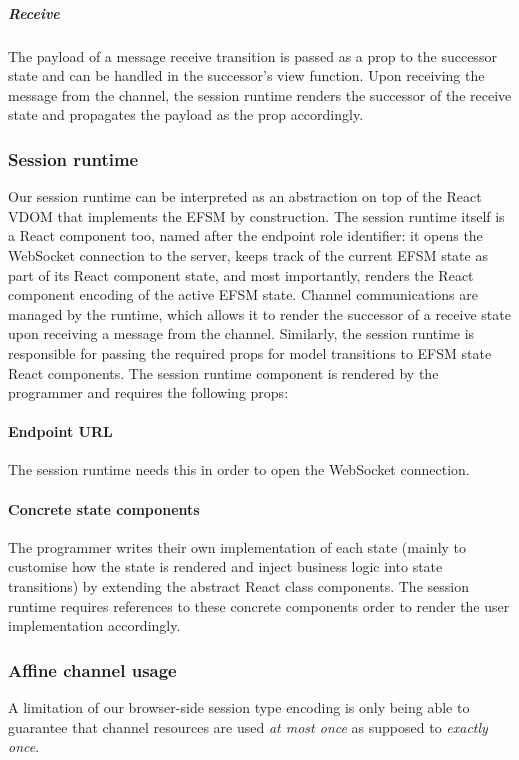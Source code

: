 \documentclass[submission,copyright,creativecommons]{eptcs}
\begin{document}
\subparagraph{Receive} The payload of a message receive transition is passed as a prop to the successor state and can be handled in the successor's view function. Upon receiving the message from the channel, the session runtime renders the successor of the receive state and propagates the payload as the prop accordingly.

\subsubsection{Session runtime}
\label{section:clientruntime}

Our session runtime can be interpreted as an abstraction on top of the React VDOM that implements the EFSM by construction. The session runtime itself is a React component too, named after the endpoint role identifier: it opens the WebSocket connection to the server, keeps track of the current EFSM state as part of its React component state, and most importantly, renders the React component encoding of the active EFSM state. Channel communications are managed by the runtime, which allows it to render the successor of a receive state upon receiving a message from the channel. Similarly, the session runtime is responsible for passing the required props for model transitions to EFSM state React components. The session runtime component is rendered by the programmer and requires the following props:

\paragraph{Endpoint URL} The session runtime needs this in order to open the WebSocket connection.

\paragraph{Concrete state components} The programmer writes their own implementation of each state (mainly to customise how the state is rendered and inject business logic into state transitions) by extending the abstract React class components. The session runtime requires references to these concrete components order to render the user implementation accordingly.

\subsubsection{Affine channel usage}
A limitation of our browser-side session type encoding is only being able to guarantee that channel resources are used \textit{at most once} as supposed to \textit{exactly once}.
\end{document}
